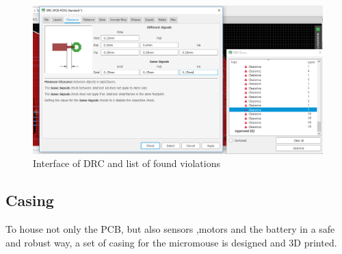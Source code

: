 \begin{figure}[htb]
    \centering
    \includegraphics[width=1\textwidth]{figures/hardware/DRC.PNG}
    \caption{Interface of DRC and list of found violations}
    \label{fig:drc}
\end{figure}


\FloatBarrier
\vspace{1cm}

\subsection{Casing}

To house not only the PCB, but also sensors ,motors and the battery in a safe and robust way, a set of casing for the micromouse is designed and 3D printed.

